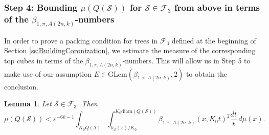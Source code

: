 \documentclass[12pt]{amsart}
\numberwithin{equation}{section}
\theoremstyle{plain}
\newtheorem{lemma}[theorem]{Lemma}
\theoremstyle{definition}
\theoremstyle{remark}
\begin{document}
\subsubsection{Step 4: Bounding $\mu(Q(\mathcal{S}))$ for $\mathcal{S}\in \mathcal{F}_3$ from above in terms of the $\beta_{1,\pi,A(2n,k)}$-numbers}\label{sss:Step4}
In order to prove a packing condition for trees in $\mathcal F_3$ defined at the beginning of Section \ref{ss:BuildingCoronization}, we estimate the measure of the corresponding top cubes in terms of the $\beta_{1,\pi,A(2n,k)}$-numbers.  This will allow us in Step 5 to make use of our assumption $E\in \mathrm{GLem}(\beta_{1,\pi,A(2n,k)},2)$ to obtain the conclusion.
\begin{lemma}\label{l:HLem7.1}
   Let $\mathcal{S}\in \mathcal{F}_3$. Then
    \begin{equation}\label{eq:lemma7.1}
\mu(Q(\mathcal{S}))<{\varepsilon}^{-6k-1}  \int_{{K_0}Q(\mathcal{S})}\int_{h_{\mathcal{S}}(x)/{K_0}}^{{K_0}\mathrm{diam}(Q(\mathcal{S}))}\beta_{1,\pi,A(2n,k)}(x,{K_0}t)^2\frac{dt}{t}\,d\mu(x).   
    \end{equation}
\end{lemma}
\end{document}

